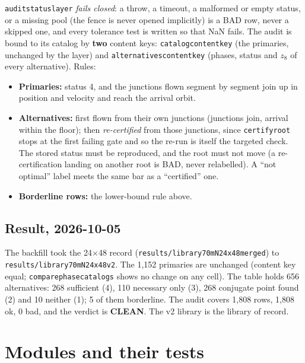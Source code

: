 \documentclass[11pt]{article}
\renewcommand{\_}{\textunderscore\allowbreak}
\newcommand{\code}[1]{\texttt{#1}}
\newcommand{\file}[1]{\texttt{\small #1}}
\begin{document}
\code{audit\_status\_layer} \emph{fails closed}: a throw, a timeout, a
malformed or empty status, or a missing pool (the fence is never opened
implicitly) is a BAD row, never a skipped one, and every tolerance test is
written so that NaN fails. The audit is bound to its catalog by \textbf{two}
content keys: \code{catalog\_content\_key} (the primaries, unchanged by the
layer) and \code{alternatives\_content\_key} (phases, status and $z_8$ of
every alternative). Rules:
\begin{itemize}[itemsep=1pt]
\item \textbf{Primaries:} status 4, and the junctions flown segment by segment
  join up in position and velocity and reach the arrival orbit.
\item \textbf{Alternatives:} first flown from their own junctions (junctions
  join, arrival within the floor); then \emph{re-certified} from those
  junctions, since \code{certify\_root} stops at the first failing gate and so
  the re-run is itself the targeted check. The stored status must be
  reproduced, and the root must not move (a re-certification landing on
  another root is BAD, never relabelled). A ``not optimal'' label meets the
  same bar as a ``certified'' one.
\item \textbf{Borderline rows:} the lower-bound rule above.
\end{itemize}

\subsection{Result, 2026-10-05}

The backfill took the 24$\times$48 record
(\file{results/library\_70mN\_24x48\_merged}) to
\file{results/library\_70mN\_24x48\_v2}. The 1,152 primaries are unchanged
(content key equal; \code{compare\_phase\_catalogs} shows no change on any
cell). The table holds 656 alternatives: 268 sufficient (4), 110 necessary
only (3), 268 conjugate point found (2) and 10 neither (1); 5 of them
borderline. The audit covers 1,808 rows, 1,808 ok, 0 bad, and the verdict is
\textbf{CLEAN}. The v2 library is the library of record.

\section{Modules and their tests}
\end{document}
